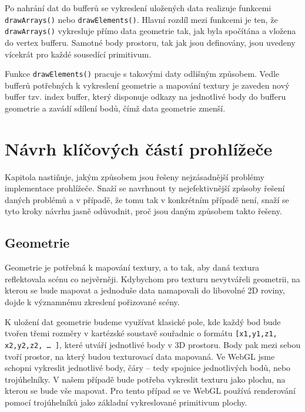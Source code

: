 Po nahrání dat do bufferů se vykreslení uložených data realizuje funkcemi \texttt{drawArrays()} nebo \texttt{drawElements()}. Hlavní rozdíl mezi funkcemi je ten, že \texttt{drawArrays()} vykresluje přímo data geometrie tak,  jak byla spočítána a vložena do vertex bufferu. Samotné body prostoru, tak jak jsou definovány, jsou uvedeny vícekrát pro každé sousedící primitivum.

Funkce \texttt{drawElements()} pracuje s takovými daty odlišným způsobem. Vedle bufferů potřebných k vykreslení geometrie a mapování textury je zaveden nový buffer tzv. index buffer, který disponuje odkazy na jednotlivé body do bufferu geometrie a zavádí sdílení bodů, čímž data geometrie zmenší. 

 



\newpage

\chapter{Návrh klíčových částí prohlížeče}
\label{chapter:3}
Kapitola nastiňuje, jakým způsobem jsou řešeny nejzásadnější problémy implementace prohlížeče. Snaží se navrhnout ty nejefektivnější způsoby řešení daných problémů a v případě, že tomu tak v konkrétním případě není, snaží se tyto  kroky návrhu jasně odůvodnit, proč jsou  daným způsobem takto řešeny.


\section{Geometrie}
Geometrie je potřebná k mapování textury, a to tak, aby daná textura reflektovala scénu co nejvěrněji. Kdybychom pro texturu nevytvářeli geometrii, na kterou se bude mapovat a jednoduše data namapovali do libovolné 2D roviny, dojde k významnému zkreslení pořizované scény.

K uložení dat geometrie budeme využívat klasické pole, kde každý bod bude tvořen třemi rozměry v kartézské soustavě souřadnic o formátu \texttt{[x1,y1,z1, x2,y2,z2, … ]}, které utváří jednotlivé body v 3D prostoru. Body pak mezi sebou tvoří prostor, na který budou texturovací data  mapovaná. Ve WebGL jsme schopni vykreslit jednotlivé body, čáry – tedy spojnice jednotlivých bodů, nebo trojúhelníky. V našem případě bude potřeba vykreslit texturu jako plochu, na kterou se bude vše mapovat. Pro tento případ se ve WebGL používá renderování pomocí trojúhelníků jako základní vykreslované primitivum plochy.

